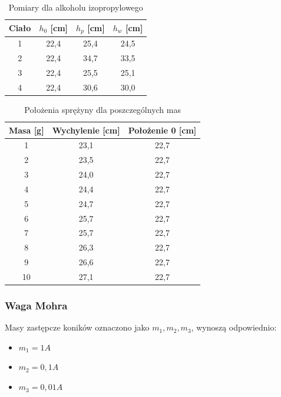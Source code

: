\documentclass[a4paper,12pt]{article}
\begin{document}
\begin{table}[h]
    \centering
    \begin{tabular}{|c|c|c|c|}
        \hline
        Ciało & $h_0$ [cm] & $h_p$ [cm] & $h_w$ [cm] \\
        \hline
        1 & 22,4 & 25,4 & 24,5 \\
        \hline
        2 & 22,4 & 34,7 & 33,5 \\
        \hline
        3 & 22,4 & 25,5 & 25,1 \\
        \hline
        4 & 22,4 & 30,6 & 30,0 \\
        \hline
    \end{tabular}
    \caption{Pomiary dla alkoholu izopropylowego}
    \label{tab:waga_jolly_alkohol}
\end{table}


\begin{table}[H]
    \centering
    \begin{tabular}{|c|c|c|}
        \hline
        \textbf{Masa [g]} & \textbf{Wychylenie [cm]} & \textbf{Położenie 0 [cm]} \\
        \hline
        1  & 23{,}1 & 22{,}7 \\
        2  & 23{,}5 & 22{,}7 \\
        3  & 24{,}0 & 22{,}7 \\
        4  & 24{,}4 & 22{,}7 \\
        5  & 24{,}7 & 22{,}7 \\
        6  & 25{,}7 & 22{,}7 \\
        7  & 25{,}7 & 22{,}7 \\
        8  & 26{,}3 & 22{,}7 \\
        9  & 26{,}6 & 22{,}7 \\
        10 & 27{,}1 & 22{,}7 \\
        \hline
    \end{tabular}
    \caption{Położenia sprężyny dla poszczególnych mas}
    \label{tab:pozycje_sprężyny}
\end{table}

\subsubsection*{Waga Mohra}

Masy zastępcze koników oznaczono jako $m_1, m_2, m_3$, wynoszą odpowiednio:

\begin{itemize}
    \item $m_1 = 1A$
    \item $m_2 = 0{,}1 A$
    \item $m_3 = 0{,}01 A$
\end{itemize}
\end{document}
